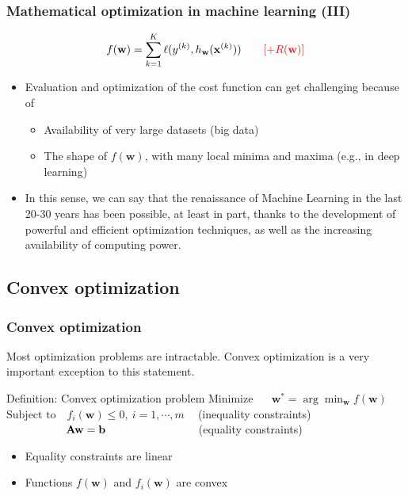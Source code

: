\documentclass{beamer}
\newcommand{\xM}{{\mathbf x}}
\newcommand{\w}{{\mathbf w}}
\begin{document}
\begin{frame}

	\frametitle{Mathematical optimization in machine learning (III)}
$$f(\w) = \sum_{k=1}^K \ell(y^{(k)}, h_\w(\xM^{(k)})) ~~~~~~ \color{red}{[+R(\w)]}$$
\begin{itemize}

\item Evaluation and optimization of the cost function can get challenging because of
	\begin{itemize}
	\item Availability of very large datasets (big data)
	\item The shape of $f(\w)$, with many local minima and maxima (e.g., in deep learning)
	\end{itemize}

\item In this sense, we can say that the renaissance of Machine Learning in the last 20-30 years has been possible, at least in part, thanks to the development of powerful and efficient optimization techniques, as well as the increasing availability of computing power.

\end{itemize}

\end{frame}

\subsection{Convex optimization}

\begin{frame}

	\frametitle{Convex optimization}

Most optimization problems are intractable. Convex optimization is a very important exception to this statement. 
	
	\begin{block}{Definition: Convex optimization problem}
	$\text{Minimize~~~~~}{\w}^\ast= \arg\min_\w f(\w)$\\
	$\text{Subject to~~~} f_i(\w) \leq 0, ~i=1,\cdots,m~~~~$ (inequality constraints)\\
	$\text{~~~~~~~~~~~~~~~~} {\bf A}{\w} = {\bf b}~~~~~~~~~~~~~~~~~~~~~~~~$ (equality constraints)
	
	\end{block}

	\begin{itemize}
		\item Equality constraints are linear
		\item Functions $f(\w)$ and $f_i(\w)$ are convex
	\end{itemize}

\end{frame}
\end{document}
